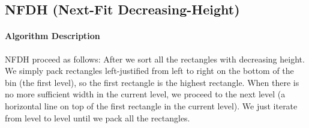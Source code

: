 \documentclass[sigplan,screen,nonacm]{acmart}\settopmatter{printfolios=true,printccs=false,printacmref=false}
\begin{document}
\subsection{NFDH (Next-Fit Decreasing-Height)}
\paragraph*{Algorithm Description}
NFDH proceed as follows: After we sort all the rectangles with decreasing height. We simply pack rectangles left-justified from left to right on the bottom of the bin (the first level), so the first rectangle is the highest rectangle. When there is no more sufficient width in the current level, we proceed to the next level (a horizontal line on top of the first rectangle in the current level). We just iterate from level to level until we pack all the rectangles.
\end{document}
